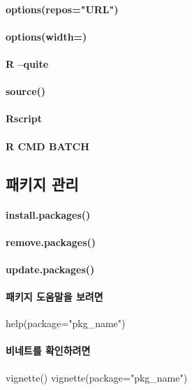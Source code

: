 \paragraph{options(repos="URL")}
\paragraph{options(width=)}
\paragraph{R --quite}
\paragraph{source()}
\paragraph{Rscript}
\paragraph{R CMD BATCH}
\paragraph{}
\paragraph{}



\subsection{패키지 관리}

\paragraph{install.packages()}
\paragraph{remove.packages()}
\paragraph{update.packages()}
\paragraph{패키지 도움말을 보려면 } help(package="pkg_{name}")
\paragraph{비네트를 확인하려면 }  
vignette()
vignette(package="pkg_{name}")
